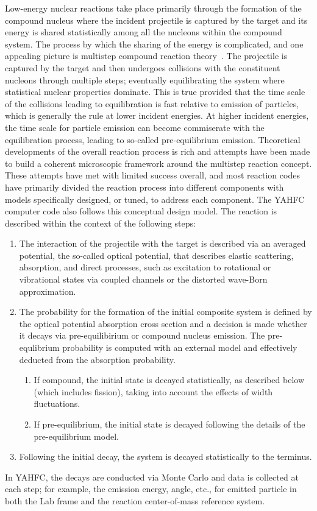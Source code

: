 \documentclass[
10pt,
showpacs,preprintnumbers,footinbib,
amsfonts,amsmath,amssymb,
aps,
prc,twocolumn,groupedaddress,superscriptaddress,
showkeys,
nofootinbib
]{revtex4-1}
\begin{document}
Low-energy nuclear reactions take place primarily through the formation of the compound nucleus where the incident projectile is captured by the target and its energy is shared statistically among all the nucleons within the compound system. The process by which the sharing of the energy is complicated, and one appealing picture is multistep compound reaction theory~\cite{Feshbach:1980}. The projectile is captured by the target and then undergoes collisions with the constituent nucleons through multiple steps; eventually equilibrating the system where statistical nuclear properties dominate. This is true provided that the time scale of the collisions leading to equilibration is fast relative to emission of particles, which is generally the rule at lower incident energies. At higher incident energies, the time scale for particle emission can become commiserate with the equilibration process, leading to so-called pre-equilibrium emission. Theoretical developments of the overall reaction process is rich and attempts have been made to build a coherent microscopic framework around the multistep reaction concept. These attempts have met with limited success overall, and most reaction codes have primarily divided the reaction process into different components with models specifically designed, or tuned, to address each component. The YAHFC computer code also follows this conceptual design model. The reaction is described within the context of the following steps:
\begin{enumerate}
\item The interaction of the projectile with the target is described via an averaged potential, the so-called optical potential, that describes elastic scattering, absorption, and direct processes, such as excitation to rotational or vibrational states via coupled channels or the distorted wave-Born approximation.
\item The probability for the formation of the initial composite system is defined by the optical potential absorption cross section and a decision is made whether it decays via pre-equilibirium or compound nucleus emission. The pre-equlibrium probability is computed with an external model and effectively deducted from the absorption probability.
\begin{enumerate} 
\item If compound, the initial state is decayed statistically, as described below (which includes fission), taking into account the effects of width fluctuations.
\item If pre-equilibrium, the initial state is decayed following the details of the pre-equilibrium model.
\end{enumerate}
\item Following the initial decay, the system is decayed statistically to the terminus.
\end{enumerate}
In YAHFC, the decays are conducted via Monte Carlo and data is collected at each step; for example, the emission energy, angle, etc., for emitted particle in both the Lab frame and the reaction center-of-mass reference system.
\end{document}
